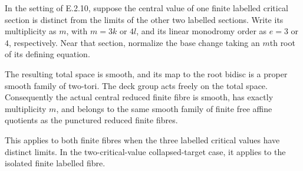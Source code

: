 \begin{proposition}
In the setting of E.2.10, suppose the central value of
one finite labelled critical section is distinct from
the limits of the other two labelled sections.  Write
its multiplicity as $m$, with $m=3k$ or $4l$, and its
linear monodromy order as $e=3$ or $4$, respectively.
Near that section, normalize the base change taking
an $m$th root of its defining equation.

The resulting total space is smooth, and its map to
the root bidisc is a proper smooth family of two-tori.
The deck group acts freely on the total space.
Consequently the actual central reduced finite fibre
is smooth, has exactly multiplicity $m$, and belongs
to the same smooth family of finite free affine
quotients as the punctured reduced finite fibres.

This applies to both finite fibres when the three
labelled critical values have distinct limits.  In
the two-critical-value collapsed-target case, it
applies to the isolated finite labelled fibre.
\end{proposition}
